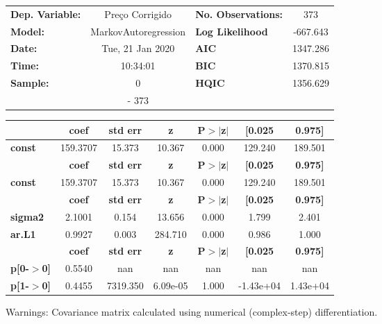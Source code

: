 \begin{center}
\begin{tabular}{lclc}
\toprule
\textbf{Dep. Variable:} &   Preço Corrigido    & \textbf{  No. Observations:  } &    373      \\
\textbf{Model:}         & MarkovAutoregression & \textbf{  Log Likelihood     } &  -667.643   \\
\textbf{Date:}          &   Tue, 21 Jan 2020   & \textbf{  AIC                } &  1347.286   \\
\textbf{Time:}          &       10:34:01       & \textbf{  BIC                } &  1370.815   \\
\textbf{Sample:}        &          0           & \textbf{  HQIC               } &  1356.629   \\
\textbf{}               &         - 373        & \textbf{                     } &             \\
\bottomrule
\end{tabular}
\begin{tabular}{lcccccc}
               & \textbf{coef} & \textbf{std err} & \textbf{z} & \textbf{P$>$$|$z$|$} & \textbf{[0.025} & \textbf{0.975]}  \\
\midrule
\textbf{const} &     159.3707  &       15.373     &    10.367  &         0.000        &      129.240    &      189.501     \\
               & \textbf{coef} & \textbf{std err} & \textbf{z} & \textbf{P$>$$|$z$|$} & \textbf{[0.025} & \textbf{0.975]}  \\
\midrule
\textbf{const} &     159.3707  &       15.373     &    10.367  &         0.000        &      129.240    &      189.501     \\
                & \textbf{coef} & \textbf{std err} & \textbf{z} & \textbf{P$>$$|$z$|$} & \textbf{[0.025} & \textbf{0.975]}  \\
\midrule
\textbf{sigma2} &       2.1001  &        0.154     &    13.656  &         0.000        &        1.799    &        2.401     \\
\textbf{ar.L1}  &       0.9927  &        0.003     &   284.710  &         0.000        &        0.986    &        1.000     \\
                   & \textbf{coef} & \textbf{std err} & \textbf{z} & \textbf{P$>$$|$z$|$} & \textbf{[0.025} & \textbf{0.975]}  \\
\midrule
\textbf{p[0-$>$0]} &       0.5540  &          nan     &       nan  &           nan        &          nan    &          nan     \\
\textbf{p[1-$>$0]} &       0.4455  &     7319.350     &  6.09e-05  &         1.000        &    -1.43e+04    &     1.43e+04     \\
\bottomrule
\end{tabular}
\end{center}

Warnings: \newline
 [1] Covariance matrix calculated using numerical (complex-step) differentiation.